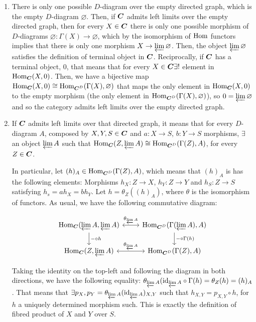 \begin{sol}
	\begin{enumerate}[label=\alph*)]
		\item There is only one possible $D$-diagram over the empty directed graph, which is the empty $D$-diagram $\varnothing$. Then, if $\boldsymbol{C}$ admits left limits over the empty directed graph, then for every $X \in \boldsymbol{C}$ there is only one possible morphism of $D$-diagrams $\varnothing: \Gamma(X) \to \varnothing$, which by the isomorphism of $\mathrm{Hom}$ functors implies that there is only one morphism $X \to \varprojlim \varnothing$. Then, the object $\varprojlim \varnothing$ satisfies the definition of terminal object in $\boldsymbol{C}$. Reciprocally, if $\boldsymbol{C}$ has a terminal object, 0, that means that for every $X \in \boldsymbol{C} \exists !$ element in $\mathrm{Hom}_{\boldsymbol{C}}(X, 0)$. Then, we have a bijective map $\mathrm{Hom}_{\boldsymbol{C}}(X,0) \cong \mathrm{Hom}_{\boldsymbol{C}^D}(\Gamma(X), \varnothing)$ that maps the only element in $\mathrm{Hom}_{\boldsymbol{C}}(X,0)$ to the empty morphism (the only element in $\mathrm{Hom}_{\boldsymbol{C}^D}(\Gamma(X), \varnothing)$), so $0 = \varprojlim \varnothing$ and so the category admits left limits over the empty directed graph. 

		\item If $\boldsymbol{C}$ admits left limits over that directed graph, it means that for every $D$-diagram $A$, composed by $X,Y,S \in \boldsymbol{C}$ and $a: X \to S$, $b: Y \to S$ morphisms, $\exists$ an object $\varprojlim A$ such that $\mathrm{Hom}_{\boldsymbol{C}}(Z, \varprojlim A) \cong \mathrm{Hom}_{\boldsymbol{C}^D}(\Gamma(Z), A)$, for every $Z \in \boldsymbol{C}$.

		In particular, let $(h)_A \in \mathrm{Hom}_{\boldsymbol{C}^D}(\Gamma(Z), A)$, which means that $(h)_A$ is has the following elements: Morphisms $h_X: Z \to X$, $h_Y: Z \to Y$ and $h_S: Z \to S$ satisfying $h_s = ah_X = bh_Y$. Let $h = \theta_Z((h)_A)$, where $\theta$ is the isomorphism of functors. As usual, we have the following commutative diagram:

		\[
			\begin{tikzcd}
				\Hom_{\Cat}(\varprojlim A, \varprojlim A) \arrow[r, "\theta_{\varprojlim A}", leftrightarrow] \arrow[d, "- \circ h"]
				  & \Hom_{\Cat^D} (\Gamma(\varprojlim A), A) \arrow[d, "- \circ \Gamma \left( h \right )"]\\
				\Hom_{\Cat}(Z, \varprojlim A) \arrow[r, "\theta_{\varprojlim A}", leftrightarrow] 
				  & \Hom_{\Cat^D} (\Gamma(Z), A) 
			\end{tikzcd}
		\]

		Taking the identity on the top-left and following the diagram in both directions, we have the following equality: $\theta_{\varprojlim A} (\text{id}_{\varprojlim A} \circ \Gamma(h) = \theta_{Z}(h) = (h)_A$. That means that $\exists p_X, p_Y = \theta_{\varprojlim A} (\text{id}_{\varprojlim A})_{X,Y}$ such that $h_{X,Y} = p_{X,Y} \circ h$, for $h$ a uniquely determined morphism such. This is exactly the definition of fibred product of $X$ and $Y$ over $S$.


\end{enumerate}
\end{sol}
